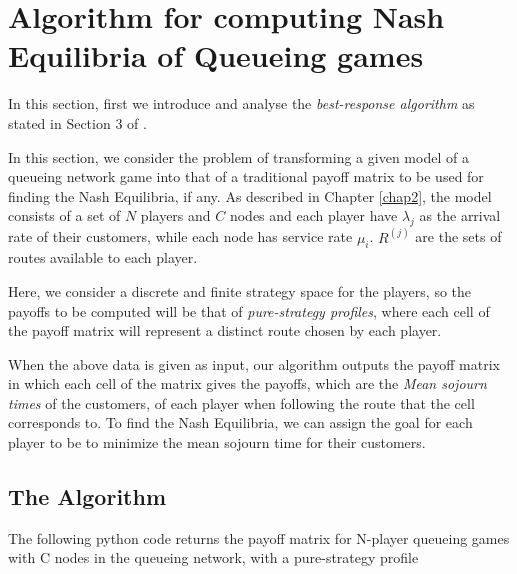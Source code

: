 \chapter{Algorithm for computing Nash Equilibria of Queueing games}

In this section, first we introduce and analyse the \textit{best-response algorithm} as stated in Section 3 of \cite{laan}.

In this section, we consider the problem of transforming a given model of a queueing network game into that of a traditional payoff matrix to be used for finding the Nash Equilibria, if any. As described in Chapter \ref{chap2}, the model consists of a set of $N$ players and $C$ nodes and each player have $\lambda_j$ as the arrival rate of their customers, while each node has service rate $\mu_i$. $R^(j)$ are the sets of routes available to each player.

Here, we consider a discrete and finite strategy space for the players, so the payoffs to be computed will be that of \textit{pure-strategy profiles}, where each cell of the payoff matrix will represent a distinct route chosen by each player.

When the above data is given as input, our algorithm outputs the payoff matrix in which each cell of the matrix gives the payoffs, which are the \textit{Mean sojourn times} of the customers, of each player when following the route that the cell corresponds to. To find the Nash Equilibria, we can assign the goal for each player to be to minimize the mean sojourn time for their customers.



\section{The Algorithm}

The following python code returns the payoff matrix for N-player queueing games with C nodes in the queueing network, with a pure-strategy profile

